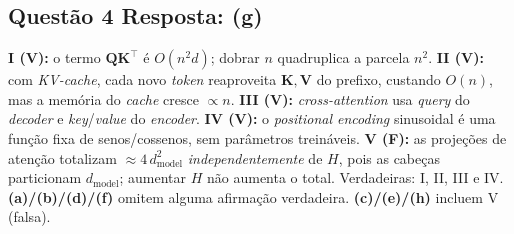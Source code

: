 \documentclass[11pt,a4paper]{article}
\begin{document}
\subsection*{Questão 4 \textemdash{} Resposta: (g)}
\textbf{I (V):} o termo $\mathbf{Q}\mathbf{K}^\top$ é $O(n^2 d)$; dobrar $n$ quadruplica a parcela $n^2$.
\textbf{II (V):} com \textit{KV-cache}, cada novo \textit{token} reaproveita $\mathbf{K}, \mathbf{V}$ do prefixo, custando $O(n)$, mas a memória do \textit{cache} cresce $\propto n$.
\textbf{III (V):} \textit{cross-attention} usa \textit{query} do \textit{decoder} e \textit{key}/\textit{value} do \textit{encoder}.
\textbf{IV (V):} o \textit{positional encoding} sinusoidal é uma função fixa de senos/cossenos, sem parâmetros treináveis.
\textbf{V (F):} as projeções de atenção totalizam $\approx 4\,d_{\text{model}}^2$ \emph{independentemente} de $H$, pois as cabeças particionam $d_{\text{model}}$; aumentar $H$ não aumenta o total.
Verdadeiras: I, II, III e IV.\\
\textbf{(a)/(b)/(d)/(f)} omitem alguma afirmação verdadeira.
\textbf{(c)/(e)/(h)} incluem V (falsa).
\end{document}
